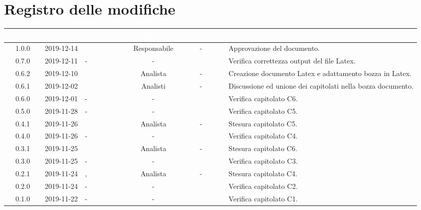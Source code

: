 \section*{Registro delle modifiche}
{
\renewcommand{\arraystretch}{1.5}
\centering
\begin{longtable}{ c c  C{2.5cm} c c C{3.5cm}}
\textcolor{white}{\textbf{Versione}}&
\textcolor{white}{\textbf{Data}}&
\textcolor{white}{\textbf{Nominativo}}&
\textcolor{white}{\textbf{Ruolo}}&
\textcolor{white}{\textbf{Verificatore}}&
\textcolor{white}{\textbf{Descrizione}}\\	
\endhead

1.0.0 & 2019-12-14 & \SE{} & Responsabile & - & Approvazione del documento. \\	

0.7.0 & 2019-12-11 & - & - & \DF{} & Verifica correttezza output del file Latex. \\

0.6.2 & 2019-12-10 & \MC{} & Analista & - & Creazione documento Latex e adattamento bozza in Latex. \\

0.6.1 & 2019-12-02 & \Gruppo{} & Analisti & - & Discussione ed unione dei capitolati nella bozza documento. \\

0.6.0 & 2019-12-01 & - & - & \DF{} & Verifica capitolato C6. \\

0.5.0 & 2019-11-28 & - & - & \DF{} & Verifica capitolato C5. \\

0.4.1 & 2019-11-26 & \BR{} & Analista & - & Stesura capitolato C5. \\

0.4.0 & 2019-11-26 & - & - & \DF{} & Verifica capitolato C4. \\

0.3.1 & 2019-11-25 & \MC{} & Analista & - & Stesura capitolato C6. \\

0.3.0 & 2019-11-25 & - & - & \DF{} & Verifica capitolato C3. \\

0.2.1 & 2019-11-24 & \LD{}, \CE{} & Analista & - & Stesura capitolato C4. \\

0.2.0 & 2019-11-24 & - & - & \DF{} & Verifica capitolato C2. \\

0.1.0 & 2019-11-22 & - & - & \DF{} & Verifica capitolato C1. \\


\end{longtable}}
